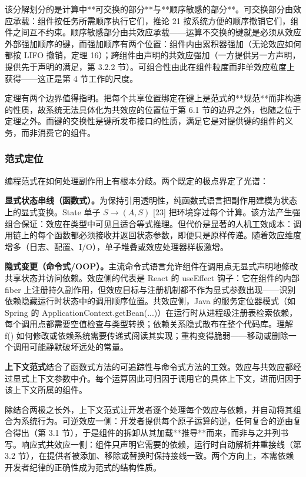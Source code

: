 \documentclass[11pt,a4paper]{article}
\theoremstyle{plain}
\theoremstyle{definition}
\theoremstyle{remark}
\begin{document}
该分解划分的是计算中**可交换的部分**与**顺序敏感的部分**。可交换部分由效应承载：组件按任务所需顺序执行它们，推论 21 按系统方便的顺序撤销它们，组件之间互不约束。顺序敏感部分由共效应承载——运算不交换的键就是必须从效应外部强加顺序的键，而强加顺序有两个位置：组件内由累积器强加（无论效应如何都按 LIFO 撤销，定理 16）；跨组件由声明的共效应强加（一方提供另一方声明，提供先于声明的满足，第 3.2.2 节）。可组合性由此在组件粒度而非单效应粒度上获得——这正是第 4 节工作的尺度。

定理有两个边界值得指明。把每个共享位置绑定在键上是范式的**规范**而非构造的性质，故系统无法具体化为共效应的位置位于第 6.1 节的边界之外，也随之位于定理之外。而键的交换性是键所发布接口的性质，满足它是对提供键的组件的义务，而非消费它的组件。

\subsubsection{范式定位}

编程范式在如何处理副作用上有根本分歧。两个既定的极点界定了光谱：

\textbf{显式状态串线（函数式）。}为保持引用透明性，纯函数式语言把副作用建模为状态上的显式变换。State 单子 $S \to (A, S)$ [23] 把环境穿过每个计算。该方法产生强组合保证：效应在类型中可见且适合等式推理。但代价是显著的人机工效成本：调用链上的每个函数都必须接收并返回状态参数，即便只是原样传递。随着效应维度增多（日志、配置、I/O），单子堆叠或效应处理器样板激增。

\textbf{隐式变更（命令式/OOP）。}主流命令式语言允许组件在调用点无显式声明地修改共享状态并访问依赖。效应侧的代表是 React 的 useEffect 钩子：它在组件的内部 fiber 上注册持久副作用，但效应目标与注册机制都不作为显式参数出现——识别依赖隐藏运行时状态中的调用顺序位置。共效应侧，Java 的服务定位器模式（如 Spring 的 ApplicationContext.getBean(...)）在运行时从进程级注册表检索依赖，每个调用点都需要空值检查与类型转换；依赖关系隐式散布在整个代码库。理解 f() 如何修改或依赖系统需要传递式阅读其实现；重构变得脆弱——移动或删除一个调用可能静默破坏远处的常量。

\textbf{上下文范式}结合了函数式方法的可追踪性与命令式方法的工效。效应与共效应都经过显式上下文参数中介。每个运算因此可归因于调用它的具体上下文，进而归因于该上下文所属的组件。

除结合两极之长外，上下文范式让开发者逐个处理每个效应与依赖，并自动将其组合为系统行为。可逆效应一侧：开发者提供每个原子运算的逆，任何复合的逆由复合得出（第 3.1 节），于是组件的拆卸从其加载**推导**而来，而非与之并列书写。响应式共效应一侧：组件只声明它需要的依赖，运行时自动解析并重接线（第 3.2 节），在提供者被添加、移除或替换时保持接线一致。两个方向上，本需依赖开发者纪律的正确性成为范式的结构性质。
\end{document}
